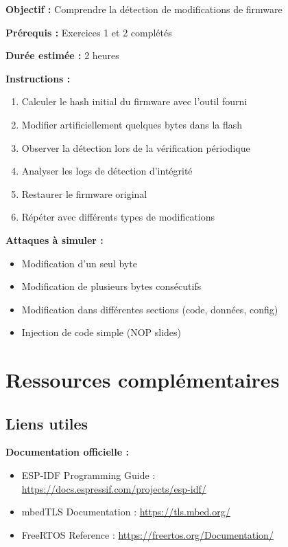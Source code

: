 \begin{figure}[h]
\begin{table}[h]
\textbf{Objectif :} Comprendre la détection de modifications de firmware

\textbf{Prérequis :} Exercices 1 et 2 complétés

\textbf{Durée estimée :} 2 heures

\textbf{Instructions :}
\begin{enumerate}
    \item Calculer le hash initial du firmware avec l'outil fourni
    \item Modifier artificiellement quelques bytes dans la flash
    \item Observer la détection lors de la vérification périodique
    \item Analyser les logs de détection d'intégrité
    \item Restaurer le firmware original
    \item Répéter avec différents types de modifications
\end{enumerate}

\textbf{Attaques à simuler :}
\begin{itemize}
    \item Modification d'un seul byte
    \item Modification de plusieurs bytes consécutifs
    \item Modification dans différentes sections (code, données, config)
    \item Injection de code simple (NOP slides)
\end{itemize}

\section{Ressources complémentaires}
\label{app:resources}

\subsection{Liens utiles}

\textbf{Documentation officielle :}
\begin{itemize}
    \item ESP-IDF Programming Guide : \url{https://docs.espressif.com/projects/esp-idf/}
    \item mbedTLS Documentation : \url{https://tls.mbed.org/}
    \item FreeRTOS Reference : \url{https://freertos.org/Documentation/}
\end{itemize}


\end{table}
\end{figure}
